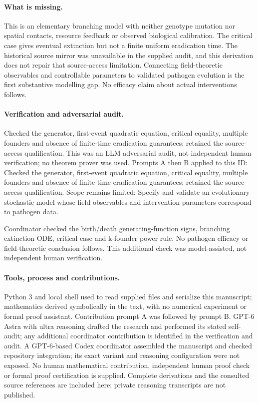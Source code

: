 \documentclass[11pt]{article}
\begin{document}
\paragraph{What is missing.}This is an elementary branching model with neither genotype mutation nor spatial contacts, resource feedback or observed biological calibration. The critical case gives eventual extinction but not a finite uniform eradication time. The historical source mirror was unavailable in the supplied audit, and this derivation does not repair that source-access limitation. Connecting field-theoretic observables and controllable parameters to validated pathogen evolution is the first substantive modelling gap. No efficacy claim about actual interventions follows.

\paragraph{Verification and adversarial audit.}
Checked the generator, first-event quadratic equation, critical equality, multiple founders and absence of finite-time eradication guarantees; retained the source-access qualification. This was an LLM adversarial audit, not independent human verification; no theorem prover was used. Prompts A then B applied to this ID: Checked the generator, first-event quadratic equation, critical equality, multiple founders and absence of finite-time eradication guarantees; retained the source-access qualification. Scope remains limited: Specify and validate an evolutionary stochastic model whose field observables and intervention parameters correspond to pathogen data.

Coordinator checked the birth/death generating-function signs, branching extinction ODE, critical case and k-founder power rule. No pathogen efficacy or field-theoretic conclusion follows. This additional check was model-assisted, not independent human verification.

\paragraph{Tools, process and contributions.}
Python 3 and local shell used to read supplied files and serialize this manuscript; mathematics derived symbolically in the text, with no numerical experiment or formal proof assistant. Contribution prompt A was followed by prompt B. GPT-6 Astra with ultra reasoning drafted the research and performed its stated self-audit; any additional coordinator contribution is identified in the verification and audit. A GPT-6-based Codex coordinator assembled the manuscript and checked repository integration; its exact variant and reasoning configuration were not exposed. No human mathematical contribution, independent human proof check or formal proof certification is supplied. Complete derivations and the consulted source references are included here; private reasoning transcripts are not published.
\end{document}
